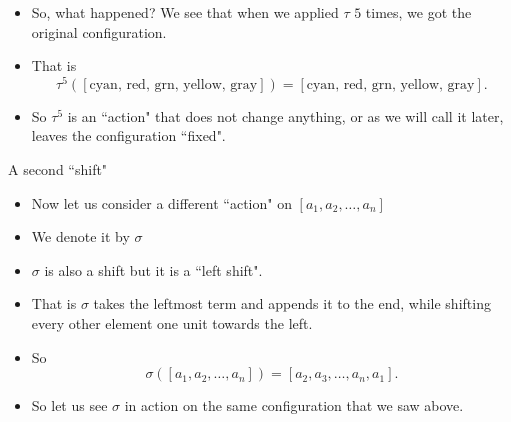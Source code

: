 \documentclass[ %
 10pt, xcolor={dvipsnames,svgnames,x11names,hyperref},
   hyperref={colorlinks=true,citecolor=green,linkcolor=DarkRed,urlcolor=ProcessBlue,anchorcolor=blue}
  ]{beamer}
\newenvironment{stepitemize}{\begin{itemize}[<+->]}{\end{itemize} }
\begin{document}
\begin{frame}
\begin{stepitemize}
    \item So, what happened? We see that when we applied $\tau$ $5$ times, we got the original configuration.
    \item That is
    $$\tau^5([\textrm{cyan, red, grn, yellow, gray}]) = [\textrm{cyan, red, grn, yellow, gray}].$$
    \item So $\tau^5$ is an ``action" that does not change anything, or as we will call it later, leaves the configuration ``fixed".
\end{stepitemize}
\end{frame}

\begin{frame}{A second ``shift"}
\begin{stepitemize}
\item Now let us consider a different ``action" on $[a_1, a_2, \dots, a_n]$
\item We denote it by $\sigma$
\item $\sigma$ is also a shift but it is a ``left shift".
\item That is $\sigma$ takes the leftmost term and appends it to the end, while shifting every other element one unit towards the left.
\item So
$$\sigma([a_1, a_2, \dots, a_n]) = [a_2, a_3, \dots, a_n, a_1]. $$
\item So let us see $\sigma$ in action on the same configuration that we saw above.
\end{stepitemize}
\end{frame}
\end{document}
